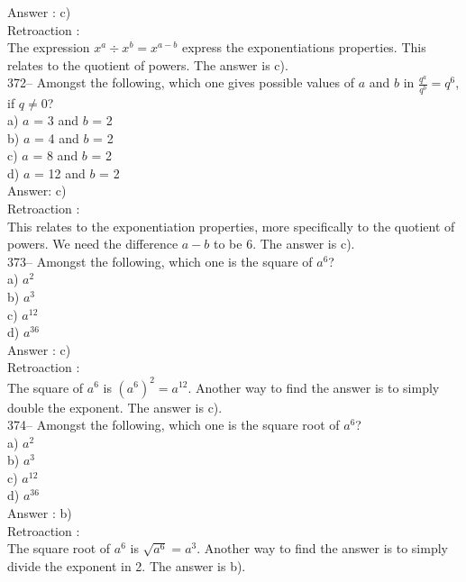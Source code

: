 ﻿\documentclass[letterpaper, 12pt]{article}
\begin{document}
Answer : c)\\

Retroaction : \\
The expression $x^{a}\div x^{b}=x^{a-b}$ express the exponentiations properties. 
This relates to the quotient of powers.  
The answer is c).\\


372-- Amongst the following, which one gives possible values of $a$ and $b$ in $\frac{q^a}{q^b}=q^{6}$, if
$q\neq0$?\\
a) $a$ = 3 and $b$ = 2\\
b) $a$ = 4 and $b$ = 2\\
c) $a$ = 8 and $b$ = 2\\
d) $a$ = 12 and $b$ = 2\\

Answer: c)\\

Retroaction : \\
This relates to the exponentiation properties, more specifically to the quotient of powers. We need the difference $a-b$ to be 6. 
The answer is c).\\

373-- Amongst the following, which one is the square of $a^{6}$?\\
a) $a^{2}$\\
b) $a^{3}$\\
c) $a^{12}$\\
d) $a^{36}$\\

Answer : c) \\

Retroaction : \\
The square of $a^{6}$ is $\left( a^{6}\right)^{2}=a^{12}$.  Another way to find the answer is to simply double the exponent. The answer is c).\\

374-- Amongst the following, which one is the square root of $a^{6}$?\\
a) $a^{2}$\\
b) $a^{3}$\\
c) $a^{12}$\\
d) $a^{36}$\\

Answer : b) \\

Retroaction : \\
The square root of $a^{6}$ is $ \sqrt{a^{6}}=a^{3}$.  Another way to find the answer is to simply divide the exponent in 2. The answer is b).\\
\end{document}
